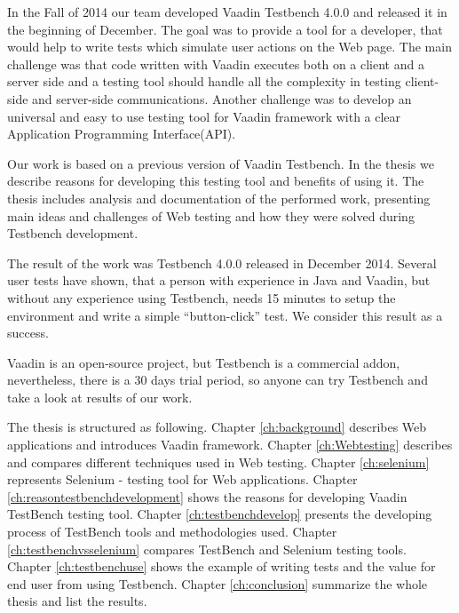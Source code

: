 	 In the Fall of 2014 our team developed Vaadin Testbench
	 4.0.0 and released it in the beginning of December. The goal was to provide a
	 tool for a developer, that would help to write tests which simulate user
	 actions on the Web page. The main challenge was that code written with Vaadin
	 executes both on a client and a server side and a testing tool should handle
	 all the complexity in testing client-side and server-side communications. Another challenge was
	 to develop an universal and easy to use testing tool for Vaadin framework with a
	 clear Application Programming Interface(API).
	 
	 Our work is based on a previous version of Vaadin Testbench. In the thesis
	 we describe reasons for developing this testing tool and benefits of using it.
	 The thesis includes analysis and documentation of the performed work,
	 presenting main ideas and challenges of Web testing and how they were
	 solved during Testbench development.
	 
	 The result of the work was Testbench 4.0.0 released in December 2014.
	 Several user tests have shown, that a person with experience in Java and
	 Vaadin, but without any experience using Testbench, needs 15 minutes to setup
	 the environment and write a simple ``button-click'' test. We consider this
	 result as a success.
	  
	 Vaadin is an open-source project, but Testbench is a commercial
	 addon, nevertheless, there is a 30 days trial period, so anyone
	 can try Testbench and take a look at results of our work.
	  
	  \iffalse
		  I will also , because Testbench is focused on testing Web
		 applications written with Vaadin. I will also describe the working flow, what
		 tools and methodologies the team used and how the final product helps
		 Vaadin developers.
	  \fi 

	  The thesis is structured as following. Chapter \ref{ch:background} describes
	  Web applications and introduces Vaadin framework. Chapter \ref{ch:Webtesting}
	  describes and compares different techniques used in Web testing. Chapter
	  \ref{ch:selenium} represents Selenium - testing tool for Web applications.
	  Chapter \ref{ch:reasontestbenchdevelopment} shows the reasons for
	  developing Vaadin TestBench testing tool. Chapter \ref{ch:testbenchdevelop} presents the developing process of TestBench tools and methodologies used.
	  Chapter \ref{ch:testbenchvsselenium} compares TestBench and Selenium testing
	  tools. Chapter \ref{ch:testbenchuse} shows the example of writing tests and
	  the value for end user from using Testbench. 
	  Chapter \ref{ch:conclusion} summarize the whole thesis and list the results.